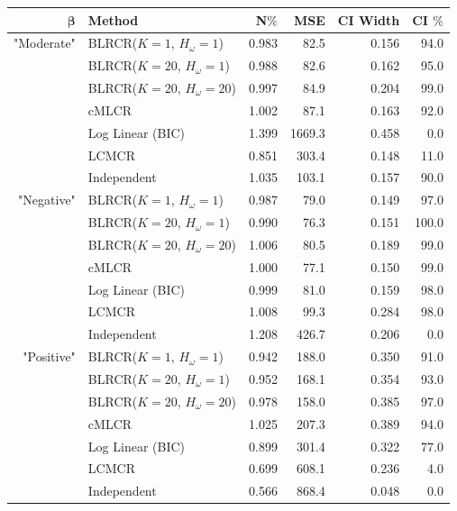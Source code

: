 \documentclass[
  12pt,
]{article}
\begin{document}
\begin{table}[H]
\centering
\begin{tabular}{||r l r r r r||} 
 \hline
$\boldsymbol{\beta}$ & Method & N$\%$ &MSE & CI Width & CI $\%$   \\ [0.5ex] 
 \hline\hline
 "Moderate"    & BLRCR($K=1$, $H_\omega=1$)  & 0.983   & 82.5   & 0.156   & 94.0 \\ 
               &  BLRCR($K=20$, $H_\omega=1$)   & 0.988     & 82.6     & 0.162     & 95.0 \\ 
               & BLRCR($K=20$, $H_\omega=20$)    & 0.997     & 84.9     & 0.204     & 99.0 \\                
               & cMLCR       & 1.002       & 87.1      & 0.163      & 92.0 \\
               & Log Linear (BIC)  & 1.399      & 1669.3     & 0.458     & 0.0 \\ 
               & LCMCR       & 0.851       & 303.4      & 0.148      & 11.0 \\ 
               & Independent & 1.035 & 103.1& 0.157& 90.0 \\ 
               

                                  
 \hline
"Negative"    & BLRCR($K=1$, $H_\omega=1$)  & 0.987   & 79.0   & 0.149   & 97.0 \\ 
               & BLRCR($K=20$, $H_\omega=1$)    & 0.990     & 76.3     & 0.151     & 100.0 \\ 
                              & BLRCR($K=20$, $H_\omega=20$)    & 1.006     & 80.5     & 0.189     & 99.0 \\                
               & cMLCR       & 1.000       & 77.1      & 0.150      & 99.0 \\
               & Log Linear (BIC)  & 0.999      & 81.0     & 0.159     & 98.0 \\ 
               & LCMCR       & 1.008       & 99.3      & 0.284      & 98.0 \\ 
               & Independent & 1.208 & 426.7& 0.206& 0.0 \\

 \hline
 "Positive"    & BLRCR($K=1$, $H_\omega=1$)  & 0.942   & 188.0   & 0.350   & 91.0 \\ 
               & BLRCR($K=20$, $H_\omega=1$)    & 0.952     & 168.1     & 0.354     & 93.0 \\ 
               & BLRCR($K=20$, $H_\omega=20$)    & 0.978     & 158.0     & 0.385     & 97.0 \\                
               & cMLCR       & 1.025       & 207.3      & 0.389      & 94.0 \\
               & Log Linear (BIC)  & 0.899      & 301.4     & 0.322     & 77.0 \\ 
               & LCMCR       & 0.699       & 608.1      & 0.236      & 4.0 \\ 
               & Independent & 0.566 & 868.4& 0.048& 0.0 \\ 


\end{tabular}
\end{table}
\end{document}
